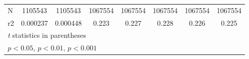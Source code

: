 {\begin{tabular}{l*{7}{c}}
N                   &     1105543         &     1105543         &     1067554         &     1067554         &     1067554         &     1067554         &     1067554         \\
r2                  &    0.000237         &    0.000448         &       0.223         &       0.227         &       0.228         &       0.226         &       0.225         \\
\hline\hline
\multicolumn{8}{l}{\footnotesize \textit{t} statistics in parentheses}\\
\multicolumn{8}{l}{\footnotesize \sym{*} \(p<0.05\), \sym{**} \(p<0.01\), \sym{***} \(p<0.001\)}\\
\end{tabular}
}
